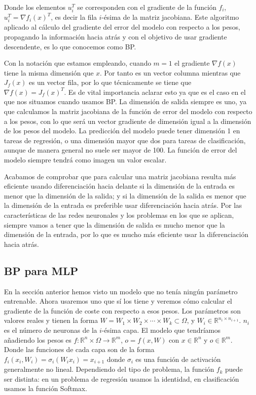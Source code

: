 Donde los elementos $u_i^T$ se corresponden con el gradiente de la función $f_i$, $u_i^T=\nabla f_i(x)^T$, es decir la fila $i$-ésima de la matriz jacobiana. Este algoritmo aplicado al cálculo del gradiente del error del modelo con respecto a los pesos, propagando la información hacia atrás y con el objetivo de usar gradiente descendente, es lo que conocemos como BP.

Con la notación que estamos empleando, cuando $m=1$ el gradiente $\nabla f(x)$ tiene la misma dimensión que $x$. Por tanto es un vector columna mientras que $J_f(x)$ es un vector fila, por lo que técnicamente se tiene que $\nabla f(x)= J_f(x)^T$. Es de vital importancia aclarar esto ya que es el caso en el que nos situamos cuando usamos BP. La dimensión de salida siempre es uno, ya que calculamos la matriz jacobiana de la función de error del modelo con respecto a los pesos, con lo que será un vector gradiente de dimensión igual a la dimensión de los pesos del modelo. La predicción del modelo puede tener dimensión 1 en tareas de regresión, o una dimensión mayor que dos para tareas de clasificación, aunque de manera general no suele ser mayor de 100. La función de error del modelo siempre tendrá como imagen un valor escalar.


Acabamos de comprobar que para calcular una matriz jacobiana resulta más eficiente usando diferenciación hacia delante si la dimensión de la entrada es menor que la dimensión de la salida; y si la dimensión de la salida es menor que la dimensión de la entrada es preferible usar diferenciación hacia atrás. Por las características de las redes neuronales y los problemas en los que se aplican, siempre vamos a tener que la dimensión de salida es mucho menor que la dimensión de la entrada, por lo que es mucho más eficiente usar la diferenciación hacia atrás. 




\subsection{BP para MLP}


En la sección anterior hemos visto un modelo que no tenía ningún parámetro entrenable. Ahora usaremos uno que sí los tiene y veremos cómo calcular el gradiente de la función de coste con respecto a esos pesos. Los parámetros son valores reales y tienen la forma $W= W_1 \times W_2 \times \cdots \times W_k \subset \Omega$, y $W_i \in \mathbb{R}^{n_i \times n_{i+1}}$. $n_i$ es el número de neuronas de la $i$-ésima capa. El modelo que tendríamos añadiendo los pesos es $f: \mathbb{R}^n \times \Omega \rightarrow \mathbb{R}^m$, $o=f(x,W)$ con $x \in \mathbb{R}^n$  y $o \in \mathbb{R}^m$. Donde las funciones de cada capa son de la forma $f_i(x_i, W_i)= \sigma_i(W_ix_i)=x_{i+1}$ donde $\sigma_i$ es una función de activación generalmente no lineal. Dependiendo del tipo de problema, la función $f_k$ puede ser distinta: en un problema de regresión usamos la identidad, en clasificación usamos la función Softmax.


